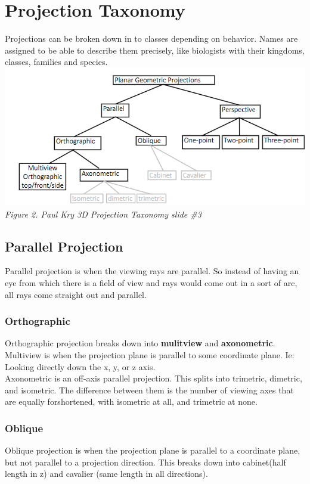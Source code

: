 \documentclass[12pt]{article}
\theoremstyle{definition}
\begin{document}
\section{Projection Taxonomy}
Projections can be broken down in to classes depending on behavior. Names are assigned to be able to describe them precisely, like biologists with their kingdoms, classes, families and species.
\\ \linebreak
\includegraphics{taxonomy}
\\ \textit{Figure 2. Paul Kry 3D Projection Taxonomy slide \#3}

\subsection{Parallel Projection}
Parallel projection is when the viewing rays are parallel. So instead of having an eye from which there is a field of view and rays would come out in a sort of arc, all rays come straight out and parallel.

\subsubsection{Orthographic}
Orthographic projection breaks down into \textbf{mulitview} and \textbf{axonometric}. 
\\ \linebreak
Multiview is when the projection plane is parallel to some coordinate plane. Ie: Looking directly down the x, y, or z axis.
\\ \linebreak
Axonometric is an off-axis parallel projection. This splits into trimetric, dimetric, and isometric. The difference between them is the number of viewing axes that are equally forshortened, with isometric at all, and trimetric at none.

\subsubsection{Oblique}
Oblique projection is when the projection plane is parallel to a coordinate plane, but not parallel to a projection direction. This breaks down into cabinet(half length in z) and cavalier (same length in all directions).
\end{document}
